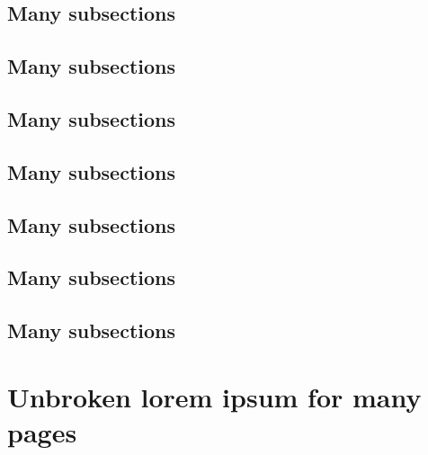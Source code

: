 \documentclass{rntz}
\begin{document}
\subsection{Many subsections}
\lipsum[20]

\subsection{Many subsections}
\lipsum[21]

\subsection{Many subsections}
\lipsum[22]

\subsection{Many subsections}
\lipsum[23]

\subsection{Many subsections}
\lipsum[24]

\subsection{Many subsections}
\lipsum[25]

\subsection{Many subsections}
\lipsum[26]


\section{Unbroken lorem ipsum for many pages}
\lipsum\lipsum[1]\lipsum\lipsum[2]\lipsum\lipsum[3]\lipsum\lipsum[4]
\lipsum\lipsum[5]\lipsum\lipsum[6]\lipsum\lipsum[7]\lipsum\lipsum[8]
\lipsum\lipsum[1]\lipsum\lipsum[2]\lipsum\lipsum[3]\lipsum\lipsum[4]
\lipsum\lipsum[5]\lipsum\lipsum[6]\lipsum\lipsum[7]\lipsum\lipsum[8]


\end{document}
